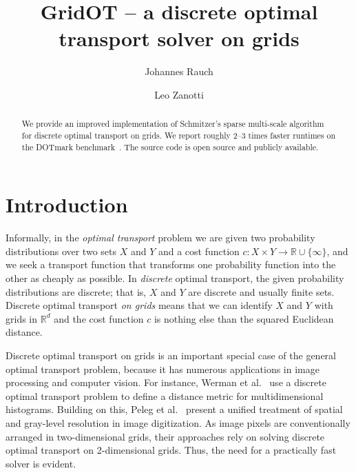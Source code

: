 \documentclass[a4paper,UKenglish,cleveref, autoref, thm-restate]{lipics-v2021}
\title{GridOT -- a discrete optimal transport solver on grids}
\author{Johannes Rauch}
{Ulm University, Institute of Optimization and Operations Research, Germany}
{johannes.rauch@uni-ulm.de}
{https://orcid.org/0000-0002-6925-8830}
{}%
\author{Leo Zanotti}
{Ulm University, Institute of Optimization and Operations Research, Germany}
{leo.zanotti@uni-ulm.de}
{https://orcid.org/0009-0001-9695-3812}
{}
\begin{document}
\maketitle

\begin{abstract}
We provide an improved implementation of Schmitzer's sparse multi-scale algorithm~\cite{schmitzer2016sparse} for discrete optimal transport on grids.
We report roughly 2--3 times faster runtimes on the DOTmark benchmark~\cite{schrieber2017dotmark}.
The source code is open source and publicly available.
\end{abstract}

\section{Introduction}\label{sec:intro}
Informally, in the \emph{optimal transport} problem we are given two probability distributions over two sets $X$ and $Y$ and a cost function $c: X \times Y \rightarrow \mathbb{R} \cup \{\infty\}$, and we seek a transport function that transforms one probability function into the other as cheaply as possible.
In \emph{discrete} optimal transport, the given probability distributions are discrete; that is, $X$ and $Y$ are discrete and usually finite sets.
Discrete optimal transport \emph{on grids} means that we can identify $X$ and $Y$ with grids in $\mathbb{R}^d$ and the cost function $c$ is nothing else than the squared Euclidean distance.

Discrete optimal transport on grids is an important special case of the general optimal transport problem, because it has numerous applications in image processing and computer vision.
For instance, Werman et al.~\cite{werman1985distance} use a discrete optimal transport problem to define a distance metric for multidimensional histograms.
Building on this, Peleg et al.~\cite{peleg1989unified} present a unified treatment of spatial and gray-level resolution in image digitization.
As image pixels are conventionally arranged in two-dimensional grids, their approaches rely on solving discrete optimal transport on 2-dimensional grids.
Thus, the need for a practically fast solver is evident.
\end{document}
